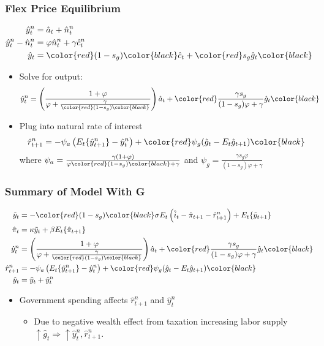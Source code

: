 \documentclass[english,xcolor=svgnames]{beamer}
\begin{document}
\begin{frame}
\frametitle{Flex Price Equilibrium}
\begin{align*}
	\hat{y}_t^n&=\hat{a}_t+\hat{n}_t^n \\
	\hat{y}_t^n-\hat{n}_t^n&=\varphi\hat{n}_t^n+\gamma\hat{c}_t^n \\
	\hat{y}_t&=\color{red}(1-s_g)\color{black}\hat{c}_t + \color{red}s_g \hat{g}_t\color{black}
\end{align*}
\begin{itemize}
	\item Solve for output:
	\begin{align*}
		\hat{y}_t^n&=\left(\frac{1+\varphi}{\varphi+\frac{\gamma}{\color{red}(1-s_g)\color{black}}}\right)\hat{a}_t + \color{red}\frac{\gamma s_g}{(1-s_g)\varphi+\gamma} \hat{g}_t\color{black}
	\end{align*}
	\item Plug into natural rate of interest
	\begin{align*}
		\hat{r}_{t+1}^n = -\psi_a\left(E_t\{\hat{y}_{t+1}^n\}-\hat{y}_t^n\right) + \color{red}\psi_g(\hat{g}_t-E_t\hat{g}_{t+1})\color{black}
	\end{align*}
	where $\psi_a=\frac{\gamma(1+\varphi)}{\varphi\color{red}(1-s_g)\color{black}+\gamma}$ and $\psi_g=\frac{\gamma s_g \varphi}{(1-s_g)\varphi+\gamma} $
\end{itemize}
\end{frame}


\begin{frame}
\frametitle{Summary of Model With G}
\begin{align*}
		\tilde{y}_t &=-\color{red}(1-s_g)\color{black}\sigma E_t\left(\hat{i}_t-\hat{\pi}_{t+1}-\hat{r}_{t+1}^n\right) + E_t\{\tilde{y}_{t+1}\}  \\
		\hat{\pi}_t &= \kappa\tilde{y}_t+\beta E_t \{\hat{\pi}_{t+1}\} \\
		\hat{y}_t^n&=\left(\frac{1+\varphi}{\varphi+\frac{\gamma}{\color{red}(1-s_g)\color{black}}}\right)\hat{a}_t + \color{red}\frac{\gamma s_g}{(1-s_g)\varphi+\gamma} \hat{g}_t\color{black} \\
		\hat{r}_{t+1}^n &= -\psi_a\left(E_t\{\hat{y}_{t+1}^n\}-\hat{y}_t^n\right) + \color{red}\psi_g(\hat{g}_t-E_t\hat{g}_{t+1})\color{black} \\
		\hat{y}_t &= \tilde{y}_t + \hat{y}_t^n
	\end{align*}
\begin{itemize}
	\item Government spending affects $\hat{r}_{t+1}^n$ and $\hat{y}_{t}^n$
	\begin{itemize}
		\item Due to negative wealth effect from taxation increasing labor supply $\uparrow\hat{g}_t\Rightarrow \uparrow \hat{y}_t^n, \hat{r}_{t+1}^n$.
	\end{itemize}
\end{itemize}
\end{frame}
\end{document}
